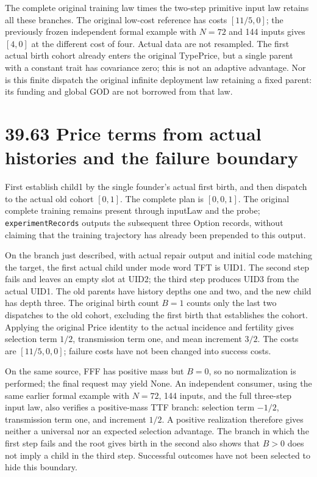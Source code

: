 \documentclass[
  english,
  11pt,
  oneside]{book}
\begin{document}
The complete original training law times the two-step primitive input law retains all these branches. The original low-cost reference has costs \([11/5,0]\); the previously frozen independent formal example with \(N=72\) and 144 inputs gives \([4,0]\) at the different cost of four. Actual data are not resampled. The first actual birth cohort already enters the original TypePrice, but a single parent with a constant trait has covariance zero; this is not an adaptive advantage. Nor is this finite dispatch the original infinite deployment law retaining a fixed parent: its funding and global GOD are not borrowed from that law.

\section{39.63 Price terms from actual histories and the failure boundary}\label{price-terms-from-actual-histories-and-the-failure-boundary}

First establish child1 by the single founder's actual first birth, and then dispatch to the actual old cohort \([0,1]\). The complete plan is \([0,0,1]\). The original complete training remains present through inputLaw and the probe; \nolinkurl{experimentRecords} outputs the subsequent three Option records, without claiming that the training trajectory has already been prepended to this output.

On the branch just described, with actual repair output and initial code matching the target, the first actual child under mode word TFT is UID1. The second step fails and leaves an empty slot at UID2; the third step produces UID3 from the actual UID1. The old parents have history depths one and two, and the new child has depth three. The original birth count \(B=1\) counts only the last two dispatches to the old cohort, excluding the first birth that establishes the cohort. Applying the original Price identity to the actual incidence and fertility gives selection term \(1/2\), transmission term one, and mean increment \(3/2\). The costs are \([11/5,0,0]\); failure costs have not been changed into success costs.

On the same source, FFF has positive mass but \(B=0\), so no normalization is performed; the final request may yield None. An independent consumer, using the same earlier formal example with \(N=72\), 144 inputs, and the full three-step input law, also verifies a positive-mass TTF branch: selection term \(-1/2\), transmission term one, and increment \(1/2\). A positive realization therefore gives neither a universal nor an expected selection advantage. The branch in which the first step fails and the root gives birth in the second also shows that \(B>0\) does not imply a child in the third step. Successful outcomes have not been selected to hide this boundary.
\end{document}
